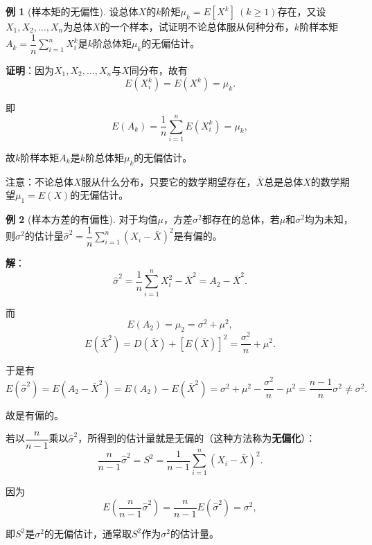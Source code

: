 \documentclass[11pt,a4paper]{report}
\theoremstyle{definition}
\newtheorem{example}{例}[chapter]
\begin{document}
\begin{example}[样本矩的无偏性]
设总体$X$的$k$阶矩$\mu_{k}=E[X^{k}]\ (k\geq 1)$存在，又设$X_{1},X_{2},\ldots,X_{n}$为总体$X$的一个样本，试证明不论总体服从何种分布，$k$阶样本矩$A_{k}=\dfrac{1}{n}\displaystyle\sum_{i=1}^{n}X_{i}^{k}$是$k$阶总体矩$\mu_{k}$的无偏估计。

\textbf{证明}：因为$X_{1},X_{2},\ldots,X_{n}$与$X$同分布，故有
\[
E(X_{i}^{k})=E(X^{k})=\mu_{k}.
\]

即
\[
E(A_{k})=\frac{1}{n}\sum_{i=1}^{n}E(X_{i}^{k})=\mu_{k},
\]

故$k$阶样本矩$A_{k}$是$k$阶总体矩$\mu_{k}$的无偏估计。

注意：不论总体$X$服从什么分布，只要它的数学期望存在，$\bar{X}$总是总体$X$的数学期望$\mu_{1}=E(X)$的无偏估计。
\end{example}

\begin{example}[样本方差的有偏性]
对于均值$\mu$，方差$\sigma^{2}$都存在的总体，若$\mu$和$\sigma^{2}$均为未知，则$\sigma^{2}$的估计量$\hat{\sigma}^{2}=\dfrac{1}{n}\displaystyle\sum_{i=1}^{n}(X_{i}-\bar{X})^{2}$是有偏的。

\textbf{解}：
\[
\hat{\sigma}^{2}=\frac{1}{n}\sum_{i=1}^{n}X_{i}^{2}-\bar{X}^{2}=A_{2}-\bar{X}^{2}.
\]

而
\[
E(A_{2})=\mu_{2}=\sigma^{2}+\mu^{2},
\]
\[
E(\bar{X}^{2})=D(\bar{X})+[E(\bar{X})]^{2}=\frac{\sigma^{2}}{n}+\mu^{2}.
\]

于是有
\[
E(\hat{\sigma}^{2})=E(A_{2}-\bar{X}^{2})=E(A_{2})-E(\bar{X}^{2})=\sigma^{2}+\mu^{2}-\frac{\sigma^{2}}{n}-\mu^{2}=\frac{n-1}{n}\sigma^{2}\neq\sigma^{2}.
\]

故是有偏的。

若以$\dfrac{n}{n-1}$乘以$\hat{\sigma}^{2}$，所得到的估计量就是无偏的（这种方法称为\textbf{无偏化}）：
\[
\frac{n}{n-1}\hat{\sigma}^{2}=S^{2}=\frac{1}{n-1}\sum_{i=1}^{n}(X_{i}-\bar{X})^{2}.
\]

因为
\[
E\left(\frac{n}{n-1}\hat{\sigma}^{2}\right)=\frac{n}{n-1}E(\hat{\sigma}^{2})=\sigma^{2},
\]

即$S^{2}$是$\sigma^{2}$的无偏估计，通常取$S^{2}$作为$\sigma^{2}$的估计量。
\end{example}
\end{document}
